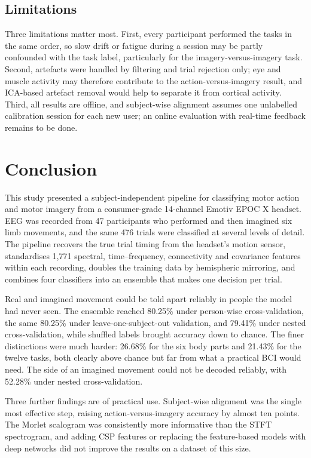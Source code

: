\documentclass[pdflatex,sn-mathphys-num]{sn-jnl}%
\theoremstyle{thmstyleone}%
\theoremstyle{thmstyletwo}%
\theoremstyle{thmstylethree}%
\begin{document}
\subsection{Limitations}\label{subsec:limits}

Three limitations matter most. First, every participant performed the tasks in the same order, so slow drift or fatigue during a session may be partly confounded with the task label, particularly for the imagery-versus-imagery task. Second, artefacts were handled by filtering and trial rejection only; eye and muscle activity may therefore contribute to the action-versus-imagery result, and ICA-based artefact removal would help to separate it from cortical activity. Third, all results are offline, and subject-wise alignment assumes one unlabelled calibration session for each new user; an online evaluation with real-time feedback remains to be done.

\FloatBarrier
\section{Conclusion}\label{sec:conclusion}

This study presented a subject-independent pipeline for classifying motor action and motor imagery from a consumer-grade 14-channel Emotiv EPOC X headset. EEG was recorded from 47 participants who performed and then imagined six limb movements, and the same 476 trials were classified at several levels of detail. The pipeline recovers the true trial timing from the headset's motion sensor, standardises 1,771 spectral, time--frequency, connectivity and covariance features within each recording, doubles the training data by hemispheric mirroring, and combines four classifiers into an ensemble that makes one decision per trial.

Real and imagined movement could be told apart reliably in people the model had never seen. The ensemble reached 80.25\% under person-wise cross-validation, the same 80.25\% under leave-one-subject-out validation, and 79.41\% under nested cross-validation, while shuffled labels brought accuracy down to chance. The finer distinctions were much harder: 26.68\% for the six body parts and 21.43\% for the twelve tasks, both clearly above chance but far from what a practical BCI would need. The side of an imagined movement could not be decoded reliably, with 52.28\% under nested cross-validation.

Three further findings are of practical use. Subject-wise alignment was the single most effective step, raising action-versus-imagery accuracy by almost ten points. The Morlet scalogram was consistently more informative than the STFT spectrogram, and adding CSP features or replacing the feature-based models with deep networks did not improve the results on a dataset of this size.
\end{document}
